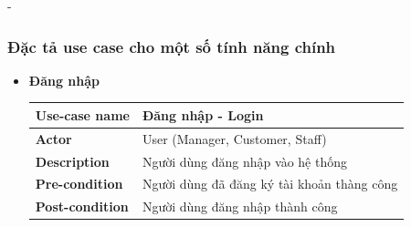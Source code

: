 \begin {list} {-}{}
\subsubsection{Đặc tả use case cho một số tính năng chính}
\begin{itemize}
    \item \textbf{Đăng nhập}
    \begin{table}[H]
        \begin{tabular}{|l|l|}
        \hline
        \textbf{Use-case name}    & \textbf{Đăng nhập - Login}                                                                                                                                                                                                                                                                                                                                                                                                                           \\ \hline
        \textbf{Actor}            & User (Manager, Customer, Staff)                                                                                                                                                                                                                                                                                                                                                                                                                      \\ \hline
        \textbf{Description}      & Người dùng đăng nhập vào hệ thống                                                                                                                                                                                                                                                                                                                                                                                                                    \\ \hline
        \textbf{Pre-condition}    & Người dùng đã đăng ký tài khoản thàng công                                                                                                                                                                                                                                                                                                                                                                                                           \\ \hline
        \textbf{Post-condition}   & Người dùng đăng nhập thành công                                                                                                                                                                                                                                                                                                                                                                                                                      \\ \hline

\end{tabular}
\end{table}
\end{itemize}
\end{list}
